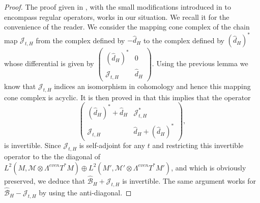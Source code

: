 \documentclass[12pt]{amsart}
\theoremstyle{plain}
\theoremstyle{definition}
\theoremstyle{remark}
\begin{document}
{\begin{proof}
The proof given in \cite{HigsonRoe1}, with the small modifications introduced in \cite{BR} to encompass regular operators, works in our situation. We recall it for the convenience of the reader. We consider the mapping cone complex of the chain map ${\mathcal J}_{t,H}$ from the complex defined by $-{\hat d}_H$ to the complex defined by $({\hat d}_H)^*$ whose differential is given by $\left(\begin{array}{cc} ({\hat d}_H)^* & 0 \\ {\mathcal J}_{t,H} &   {\hat d}_H  \end{array}\right)$. Using the previous lemma we know that ${\mathcal J}_{t,H}$ indices an isomorphism in cohomology and hence this mapping cone complex is acyclic. It is then proved in \cite{BR} that this implies that the operator 
$$
\left(\begin{array}{cc} ({\hat d}_H)^* + {\hat d}_H & {\mathcal J}_{t,H}^* \\ {\mathcal J}_{t,H} &   {\hat d}_H + ({\hat d}_{H})^* \end{array}\right),
$$
is invertible. Since ${\mathcal J}_{t,H}$ is self-adjoint for any $t$ and restricting this invertible operator to the the diagonal  of $L^2(M, {\mathcal M}\otimes \Lambda^{even}T^*M) \oplus L^2(M', {\mathcal M}'\otimes \Lambda^{even}T^*M')$, and which is obviously preserved, we deduce that ${\hat{\mathcal B}}_H + {\mathcal J}_{t, H}$ is invertible. The same argument works for ${\hat{\mathcal B}}_H - {\mathcal J}_{t, H}$ by using the anti-diagonal.
\end{proof}

}
\end{document}
